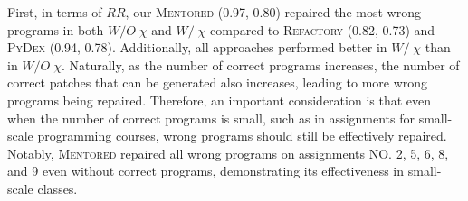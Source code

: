 \documentclass[10pt,conference]{IEEEtran}
\begin{document}
        First, in terms of $RR$, our \textsc{Mentored} (0.97, 0.80) repaired the most wrong programs in both $W/O\;\chi$ and $W/\;\chi$ compared to \textsc{Refactory} (0.82, 0.73) and \textsc{PyDex} (0.94, 0.78). Additionally, all approaches performed better in $W/\;\chi$ than in $W/O\;\chi$. Naturally, as the number of correct programs increases, the number of correct patches that can be generated also increases, leading to more wrong programs being repaired. Therefore, an important consideration is that even when the number of correct programs is small, such as in assignments for small-scale programming courses, wrong programs should still be effectively repaired. Notably, \textsc{Mentored} repaired all wrong programs on assignments NO. 2, 5, 6, 8, and 9 even without correct programs, demonstrating its effectiveness in small-scale classes.
        
\end{document}
